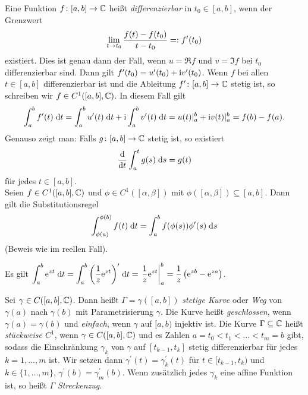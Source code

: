 \documentclass[a4paper,twoside,DIV15,BCOR12mm]{scrbook}
\begin{document}
\noindent Eine Funktion $f\colon[a,b]\to\mathbb{C}$ heißt \emph{differenzierbar} in $t_0\in[a,b]$, wenn der Grenzwert \[\lim_{t\to t_0}{\frac{f(t)-f(t_0)}{t-t_0}} =: f^\prime(t_0)\] existiert. Dies ist genau dann der Fall, wenn $u=\Re{f}$ und $v=\Im{f}$ bei $t_0$ differenzierbar sind. Dann gilt $f^\prime(t_0) = u^\prime(t_0) + \mathrm{i} v^\prime(t_0)$. Wenn $f$ bei allen $t\in[a,b]$ differenzierbar ist und die Ableitung $f^\prime\colon[a,b]\to\mathbb{C}$ stetig ist, so schreiben wir $f\in C^1([a,b],\mathbb{C})$. In diesem Fall gilt
\begin{equation}\label{2.1}
\int_{a}^{b}{f^\prime(t)}\;\mathrm{d} t = \int_{a}^{b}{u^\prime(t)}\;\mathrm{d} t + \mathrm{i}\int_{a}^{b}{v^\prime(t)}\;\mathrm{d} t = u(t)\vert_a^b + \mathrm{i} v(t)\vert_a^b = f(b) - f(a).
\end{equation}
Genauso zeigt man: Falls $g\colon[a,b]\to\mathbb{C}$ stetig ist, so existiert
\begin{equation}\label{2.2}
\frac{\mathrm{d}}{\mathrm{d}t} \int_{a}^{t}{g(s)}\;\mathrm{d} s = g(t)
\end{equation}
für jedes $t\in[a,b]$.\\
Seien $f\in C^1([a,b],\mathbb{C})$ und $\phi\in C^1([\alpha,\beta])$ mit $\phi([\alpha,\beta])\subseteq[a,b]$. Dann gilt die Substitutionsregel
\begin{equation}\label{2.3}
  \int_{\phi(a)}^{\phi(b)}{f(t)}\;\mathrm{d} t = \int_{a}^{b}{f(\phi(s))\phi^\prime(s)}\;\mathrm{d} s
\end{equation}
(Beweis wie im reellen Fall).

\begin{bsp} \label{bsp2.1}
Es gilt $\displaystyle\int_{a}^{b}{\mathrm{e}^{zt}}\;\mathrm{d} t = \int_{a}^{b}{\left(\frac1z \mathrm{e}^{zt}\right)^\prime}\;\mathrm{d} t = \left.\frac1z \mathrm{e}^{zt} \right\vert_a^b = \frac1z\left(\mathrm{e}^{zb}-\mathrm{e}^{za}\right)$.
\end{bsp}

\begin{dfn} \label{dfn2.2}
Sei $\gamma\in C([a,b],\mathbb{C})$. Dann heißt $\Gamma=\gamma([a,b])$ \emph{stetige Kurve} oder \emph{Weg} von $\gamma(a)$ nach $\gamma(b)$ mit Parametrisierung $\gamma$. Die Kurve heißt \emph{geschlossen}, wenn $\gamma(a)=\gamma(b)$ und \emph{einfach}, wenn $\gamma$ auf $[a,b)$ injektiv ist. Die Kurve $\Gamma\subseteq\mathbb{C}$ heißt \emph{stückweise $C^1$}, wenn $\gamma\in C([a,b],\mathbb{C})$ und es Zahlen $a=t_0<t_1<\dotso<t_m=b$ gibt, sodass die Einschränkung $\gamma_k$ von $\gamma$ auf $[t_{k-1},t_k]$ stetig differenzierbar für jedes $k=1,\dotsc,m$ ist. Wir setzen dann $\gamma^\prime(t)=\gamma_k^\prime(t)$ für $t\in[t_{k-1},t_k)$ und $k\in\{1,\dotsc,m\}$, $\gamma^\prime(b)=\gamma_m^\prime(b)$. Wenn zusätzlich jedes $\gamma_k$ eine affine Funktion ist, so heißt $\Gamma$ \emph{Streckenzug}.
\end{dfn}
\end{document}
